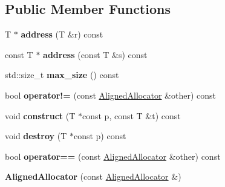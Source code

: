 \subsection*{Public Member Functions}
\begin{DoxyCompactItemize}
\item 
\mbox{\label{classraisim_1_1AlignedAllocator_ac8c5b796e1935a52e8fe6930a6d91a9c}} 
T $\ast$ {\bfseries address} (T \&r) const
\item 
\mbox{\label{classraisim_1_1AlignedAllocator_ab5c4744cfb8e40294fb79d389e4a1d16}} 
const T $\ast$ {\bfseries address} (const T \&s) const
\item 
\mbox{\label{classraisim_1_1AlignedAllocator_ab6f778ea101cb0f1e78fcc0d7260a94b}} 
std\+::size\+\_\+t {\bfseries max\+\_\+size} () const
\item 
\mbox{\label{classraisim_1_1AlignedAllocator_a1cfee957ff511286cab4130d2140d177}} 
bool {\bfseries operator!=} (const \hyperlink{classraisim_1_1AlignedAllocator}{Aligned\+Allocator} \&other) const
\item 
\mbox{\label{classraisim_1_1AlignedAllocator_ab6c7c0f9f7b0d4445378764966b91373}} 
void {\bfseries construct} (T $\ast$const p, const T \&t) const
\item 
\mbox{\label{classraisim_1_1AlignedAllocator_ac4648dbd92f8f57e34e231f3b596a09c}} 
void {\bfseries destroy} (T $\ast$const p) const
\item 
\mbox{\label{classraisim_1_1AlignedAllocator_a8e44a271bd1484ddab43667ccbe50e5d}} 
bool {\bfseries operator==} (const \hyperlink{classraisim_1_1AlignedAllocator}{Aligned\+Allocator} \&other) const
\item 
\mbox{\label{classraisim_1_1AlignedAllocator_a5b888593feb7936a8c79e9c520ced6bf}} 
{\bfseries Aligned\+Allocator} (const \hyperlink{classraisim_1_1AlignedAllocator}{Aligned\+Allocator} \&)
\item 
\mbox{\label{classraisim_1_1AlignedAllocator_a78b44f02d40dface1646ce28589ce418}} 

\end{DoxyCompactItemize}
